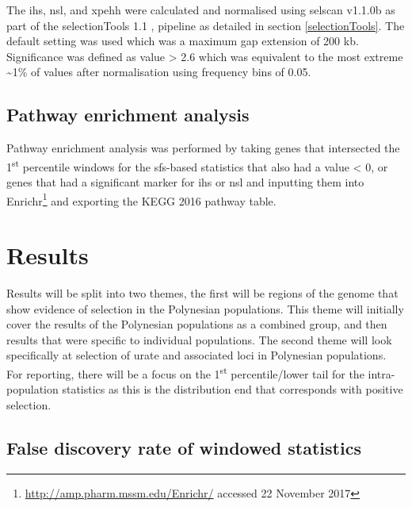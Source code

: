 \documentclass[twoside,openright]{report}
\begin{document}
The \gls{ihs}, \gls{nsl}, and \gls{xpehh} were calculated and normalised
using selscan v1.1.0b \citep{Szpiech2014} as part of the selectionTools
1.1 \citep{Cadzow2014}, pipeline as detailed in section
\ref{selectionTools}. The default setting was used which was a maximum
gap extension of 200 kb. Significance was defined as
\textbar{}value\textbar{} \textgreater{} 2.6 which was equivalent to the
most extreme \textasciitilde{}1\% of values after normalisation using
frequency bins of 0.05.

\subsection{Pathway enrichment
analysis}\label{pathway-enrichment-analysis}

Pathway enrichment analysis was performed by taking genes that
intersected the 1\textsuperscript{st} percentile windows for the
\glsdesc{sfs}-based statistics that also had a value \textless{} 0, or
genes that had a significant marker for \gls{ihs} or \gls{nsl} and
inputting them into Enrichr\footnote{\url{http://amp.pharm.mssm.edu/Enrichr/}
  accessed 22 November 2017} \citep{Chen2013b, Kuleshov2016} and
exporting the KEGG 2016 pathway table.




\section{Results}\label{results}

Results will be split into two themes, the first will be regions of the
genome that show evidence of selection in the Polynesian populations.
This theme will initially cover the results of the Polynesian
populations as a combined group, and then results that were specific to
individual populations. The second theme will look specifically at
selection of urate and associated loci in Polynesian populations. For
reporting, there will be a focus on the 1\textsuperscript{st}
percentile/lower tail for the intra-population statistics as this is the
distribution end that corresponds with positive selection.

\subsection{False discovery rate of windowed
statistics}\label{fdrresults}
\end{document}
